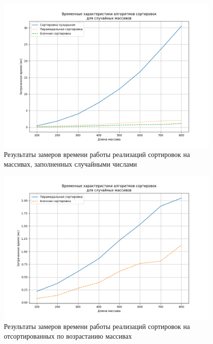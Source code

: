 \begin{figure}[h]
	\includegraphics[scale=0.5]{img/random.png}
	\centering 
	\caption{Результаты замеров времени работы реализаций сортировок на массивах, заполненных случайными числами}
	\label{img:rand_all}
\end{figure}

\begin{figure}[h]
	\includegraphics[scale=0.5]{img/random_two.png}
	\centering 
	\caption{Результаты замеров времени работы реализаций сортировок на отсортированных по возрастанию массивах}
	\label{img:rand_two}
\end{figure}

